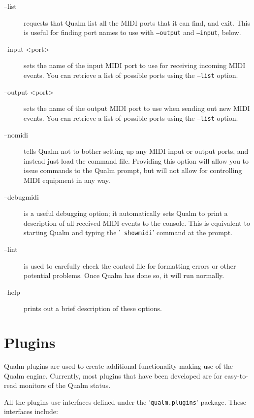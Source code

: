 \documentclass{article}
\newcommand{\q}{{\textsf{Qualm}}\xspace}
\begin{document}
\begin{description}
\item[--list] requests that \q list all the MIDI ports that it can
  find, and exit.  This is useful for finding port names to use with
  {\tt --output} and {\tt --input}, below.

\item[--input <port>] sets the name of the input MIDI port to
  use for receiving incoming MIDI events.  You can retrieve a list of
  possible ports using the {\tt --list} option.

\item[--output <port>] sets the name of the output MIDI port to
  use when sending out new MIDI events.  You can retrieve a list of
  possible ports using the {\tt --list} option.

\item[--nomidi] tells \q not to bother setting up any MIDI input or
  output ports, and instead just load the command file.  Providing
  this option will allow you to issue commands to the \q prompt, but
  will not allow for controlling MIDI equipment in any way.

\item[--debugmidi] is a useful debugging option; it automatically sets
  \q to print a description of all received MIDI events to the
  console.  This is equivalent to starting \q and typing the '{\tt
  showmidi}' command at the prompt.

\item[--lint] is used to carefully check the control file for
  formatting errors or other potential problems.  Once \q has done so,
  it will run normally.

\item[--help] prints out a brief description of these options.

\end{description}

\begin{latexonly}
\newpage
\end{latexonly}
\section{Plugins}
\label{sec:plugins}

\q plugins are used to create additional functionality making use of
the \q engine.  Currently, most plugins that have been developed are
for easy-to-read monitors of the \q status.

All the plugins use interfaces defined under the '{\tt qualm.plugins}'
package.  These interfaces include:
\end{document}
